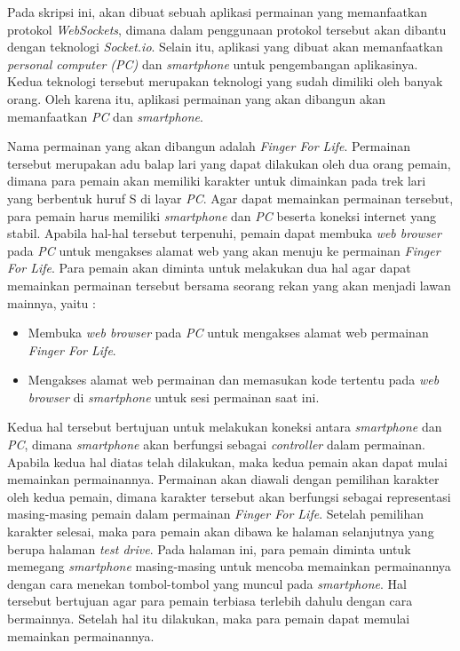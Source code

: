 \documentclass[a4paper,twoside]{article}
\begin{document}
Pada skripsi ini, akan dibuat sebuah aplikasi permainan yang memanfaatkan protokol \textit{WebSockets}, dimana dalam penggunaan protokol tersebut akan dibantu dengan teknologi \textit{Socket.io}. Selain itu, aplikasi yang dibuat akan memanfaatkan \textit{personal computer (PC)} dan \textit{smartphone} untuk pengembangan aplikasinya. Kedua teknologi tersebut merupakan teknologi yang sudah dimiliki oleh banyak orang. Oleh karena itu, aplikasi permainan yang akan dibangun akan memanfaatkan \textit{PC} dan \textit{smartphone}.

Nama permainan yang akan dibangun adalah \textit{Finger For Life}. Permainan tersebut merupakan adu balap lari yang dapat dilakukan oleh dua orang pemain, dimana para pemain akan memiliki karakter untuk dimainkan pada trek lari yang berbentuk huruf S di layar \textit{PC}. Agar dapat memainkan permainan tersebut, para pemain harus memiliki \textit{smartphone} dan \textit{PC} beserta koneksi internet yang stabil. Apabila hal-hal tersebut terpenuhi, pemain dapat membuka \textit{web browser} pada \textit{PC} untuk mengakses alamat web yang akan menuju ke permainan \textit{Finger For Life}. Para pemain akan diminta untuk melakukan dua hal agar dapat memainkan permainan tersebut bersama seorang rekan yang akan menjadi lawan mainnya, yaitu : 

\begin{itemize}
	\item Membuka \textit{web browser} pada \textit{PC} untuk mengakses alamat web permainan \textit{Finger For Life}.
	\item Mengakses alamat web permainan dan memasukan kode tertentu pada \textit{web browser} di \textit{smartphone} untuk sesi permainan saat ini.
\end{itemize}

Kedua hal tersebut bertujuan untuk melakukan koneksi antara \textit{smartphone} dan \textit{PC}, dimana \textit{smartphone} akan berfungsi sebagai \textit{controller} dalam permainan. Apabila kedua hal diatas telah dilakukan, maka kedua pemain akan dapat mulai memainkan permainannya.  Permainan akan diawali dengan pemilihan karakter oleh kedua pemain, dimana karakter tersebut akan berfungsi sebagai representasi masing-masing pemain dalam permainan \textit{Finger For Life}. Setelah pemilihan karakter selesai, maka para pemain akan dibawa ke halaman selanjutnya yang berupa halaman \textit{test drive}. Pada halaman ini, para pemain diminta untuk memegang \textit{smartphone} masing-masing untuk mencoba memainkan permainannya dengan cara menekan tombol-tombol yang muncul pada \textit{smartphone}. Hal tersebut bertujuan agar para pemain terbiasa terlebih dahulu dengan cara bermainnya. Setelah hal itu dilakukan, maka para pemain dapat memulai memainkan permainannya.
\end{document}

